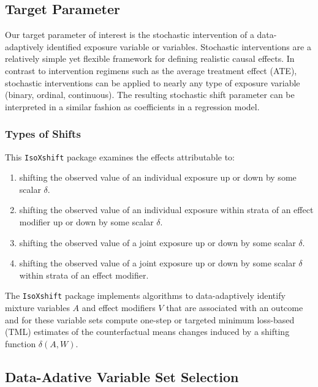 \documentclass[
]{article}
\providecommand{\tightlist}{%
  \setlength{\itemsep}{0pt}\setlength{\parskip}{0pt}}
\begin{document}
\hypertarget{target-parameter}{%
\subsection{Target Parameter}\label{target-parameter}}

Our target parameter of interest is the stochastic intervention of a
data-adaptively identified exposure variable or variables. Stochastic
interventions are a relatively simple yet flexible framework for
defining realistic causal effects. In contrast to intervention regimens
such as the average treatment effect (ATE), stochastic interventions can
be applied to nearly any type of exposure variable (binary, ordinal,
continuous). The resulting stochastic shift parameter can be interpreted
in a similar fashion as coefficients in a regression model.

\hypertarget{types-of-shifts}{%
\subsubsection{Types of Shifts}\label{types-of-shifts}}

This \texttt{IsoXshift} package examines the effects attributable to:

\begin{enumerate}
\def\labelenumi{\arabic{enumi}.}
\tightlist
\item
  shifting the observed value of an individual exposure up or down by
  some scalar \(\delta\).
\item
  shifting the observed value of an individual exposure within strata of
  an effect modifier up or down by some scalar \(\delta\).
\item
  shifting the observed value of a joint exposure up or down by some
  scalar \(\delta\).
\item
  shifting the observed value of a joint exposure up or down by some
  scalar \(\delta\) within strata of an effect modifier.
\end{enumerate}

The \texttt{IsoXshift} package implements algorithms to data-adaptively
identify mixture variables \(A\) and effect modifiers \(V\) that are
associated with an outcome and for these variable sets compute one-step
or targeted minimum loss-based (TML) estimates of the counterfactual
means changes induced by a shifting function \(\delta(A,W)\).

\hypertarget{data-adative-variable-set-selection}{%
\subsection{Data-Adative Variable Set
Selection}\label{data-adative-variable-set-selection}}
\end{document}
